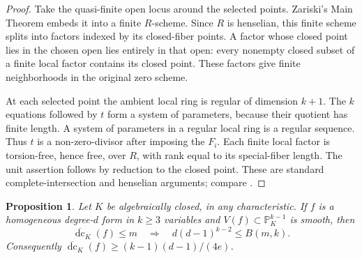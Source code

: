\documentclass[11pt]{article}
\newtheorem{proposition}[theorem]{Proposition}
\theoremstyle{remark}\newtheorem{remark}[theorem]{Remark}
\DeclareMathOperator{\dc}{dc}
\newcommand{\bdc}{\overline{\dc}}
\newcommand{\PP}{\mathbb P}
\begin{document}
\begin{proof}
Take the quasi-finite open locus around the selected points.
Zariski's Main Theorem embeds it into a finite $R$-scheme. Since
$R$ is henselian, this finite scheme splits into factors indexed by
its closed-fiber points. A factor whose closed point lies in the
chosen open lies entirely in that open: every nonempty closed
subset of a finite local factor contains its closed point. These
factors give finite neighborhoods in the original zero scheme.

At each selected point the ambient local ring is regular of
dimension $k+1$. The $k$ equations followed by $t$ form a system
of parameters, because their quotient has finite length. A system
of parameters in a regular local ring is a regular sequence.
Thus $t$ is a non-zero-divisor after imposing the $F_i$. Each
finite local factor is torsion-free, hence free, over $R$, with
rank equal to its special-fiber length. The unit assertion follows
by reduction to the closed point. These are standard
complete-intersection and henselian arguments; compare
\cite[Sections 10.104, 10.153 and Lemma 93.17.4]{Stacks}.
\end{proof}

\begin{proposition}\label{prop:anychar}
Let $K$ be algebraically closed, in any characteristic. If $f$ is
a homogeneous degree-$d$ form in $k\ge3$ variables and
$V(f)\subset\PP^{k-1}_K$ is smooth, then
\[
 \bdc_K(f)\le m\quad\Longrightarrow\quad
 d(d-1)^{k-2}\le B(m,k).
\]
Consequently $\bdc_K(f)\ge(k-1)(d-1)/(4e)$.
\end{proposition}
\end{document}
